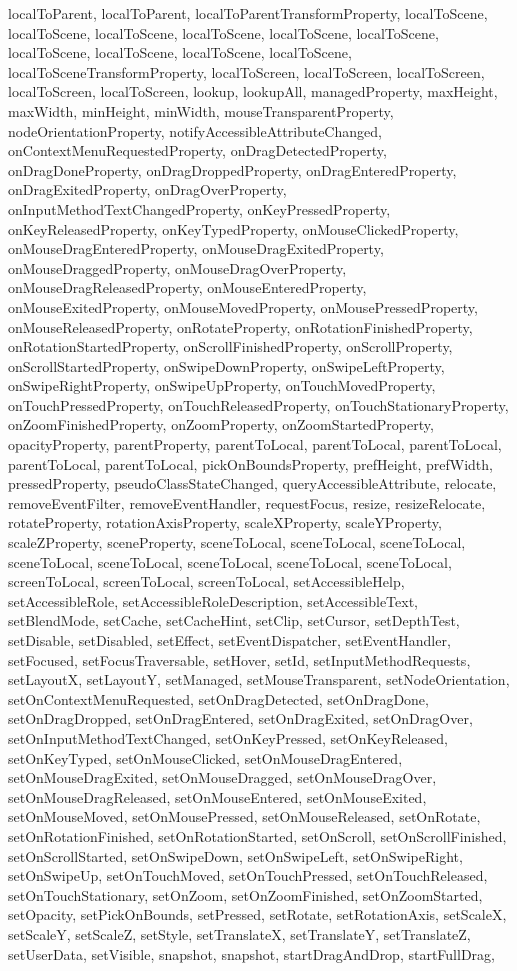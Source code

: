 {{{{{{{{{{{{{{{{{{{{{{localToParent, localToParent, localToParentTransformProperty, localToScene, localToScene, localToScene, localToScene, localToScene, localToScene, localToScene, localToScene, localToScene, localToScene, localToSceneTransformProperty, localToScreen, localToScreen, localToScreen, localToScreen, localToScreen, lookup, lookupAll, managedProperty, maxHeight, maxWidth, minHeight, minWidth, mouseTransparentProperty, nodeOrientationProperty, notifyAccessibleAttributeChanged, onContextMenuRequestedProperty, onDragDetectedProperty, onDragDoneProperty, onDragDroppedProperty, onDragEnteredProperty, onDragExitedProperty, onDragOverProperty, onInputMethodTextChangedProperty, onKeyPressedProperty, onKeyReleasedProperty, onKeyTypedProperty, onMouseClickedProperty, onMouseDragEnteredProperty, onMouseDragExitedProperty, onMouseDraggedProperty, onMouseDragOverProperty, onMouseDragReleasedProperty, onMouseEnteredProperty, onMouseExitedProperty, onMouseMovedProperty, onMousePressedProperty, onMouseReleasedProperty, onRotateProperty, onRotationFinishedProperty, onRotationStartedProperty, onScrollFinishedProperty, onScrollProperty, onScrollStartedProperty, onSwipeDownProperty, onSwipeLeftProperty, onSwipeRightProperty, onSwipeUpProperty, onTouchMovedProperty, onTouchPressedProperty, onTouchReleasedProperty, onTouchStationaryProperty, onZoomFinishedProperty, onZoomProperty, onZoomStartedProperty, opacityProperty, parentProperty, parentToLocal, parentToLocal, parentToLocal, parentToLocal, parentToLocal, pickOnBoundsProperty, prefHeight, prefWidth, pressedProperty, pseudoClassStateChanged, queryAccessibleAttribute, relocate, removeEventFilter, removeEventHandler, requestFocus, resize, resizeRelocate, rotateProperty, rotationAxisProperty, scaleXProperty, scaleYProperty, scaleZProperty, sceneProperty, sceneToLocal, sceneToLocal, sceneToLocal, sceneToLocal, sceneToLocal, sceneToLocal, sceneToLocal, sceneToLocal, screenToLocal, screenToLocal, screenToLocal, setAccessibleHelp, setAccessibleRole, setAccessibleRoleDescription, setAccessibleText, setBlendMode, setCache, setCacheHint, setClip, setCursor, setDepthTest, setDisable, setDisabled, setEffect, setEventDispatcher, setEventHandler, setFocused, setFocusTraversable, setHover, setId, setInputMethodRequests, setLayoutX, setLayoutY, setManaged, setMouseTransparent, setNodeOrientation, setOnContextMenuRequested, setOnDragDetected, setOnDragDone, setOnDragDropped, setOnDragEntered, setOnDragExited, setOnDragOver, setOnInputMethodTextChanged, setOnKeyPressed, setOnKeyReleased, setOnKeyTyped, setOnMouseClicked, setOnMouseDragEntered, setOnMouseDragExited, setOnMouseDragged, setOnMouseDragOver, setOnMouseDragReleased, setOnMouseEntered, setOnMouseExited, setOnMouseMoved, setOnMousePressed, setOnMouseReleased, setOnRotate, setOnRotationFinished, setOnRotationStarted, setOnScroll, setOnScrollFinished, setOnScrollStarted, setOnSwipeDown, setOnSwipeLeft, setOnSwipeRight, setOnSwipeUp, setOnTouchMoved, setOnTouchPressed, setOnTouchReleased, setOnTouchStationary, setOnZoom, setOnZoomFinished, setOnZoomStarted, setOpacity, setPickOnBounds, setPressed, setRotate, setRotationAxis, setScaleX, setScaleY, setScaleZ, setStyle, setTranslateX, setTranslateY, setTranslateZ, setUserData, setVisible, snapshot, snapshot, startDragAndDrop, startFullDrag, }}}}}}}}}}}}}}}}}}}}}}
